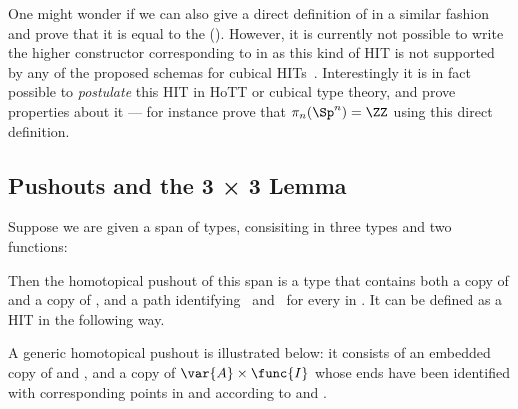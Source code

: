One might wonder if we can also give a direct definition of
 in a similar fashion and prove that it is equal to the
(). However, it is currently not possible to
write the higher constructor corresponding to  in \CubicalAgda 
as this kind of HIT is not supported by any of the proposed
schemas for cubical HITs~. Interestingly it
is in fact possible to \emph{postulate} this HIT in HoTT or cubical
type theory, and prove properties about it --- for instance
 prove that $\pi_n(\Sp^n) = \ZZ$ using this direct
definition.

\subsection{Pushouts and the 3 × 3 Lemma}
\label{sec:pushout}

Suppose we are given a span of types, consisiting in three types and two functions:

\begin{center}
\end{center}

Then the homotopical pushout of this span is a type that contains both
a copy of  and a copy of , and a path identifying
\, and \, for every  in .
It can be defined as a HIT in the following way.
% 
% 


A generic homotopical pushout is illustrated below: it consists of an
embedded copy of  and , and a copy of
\( \var{A} \times \func{I} \) whose ends have been identified with
corresponding points in  and  according to  and
.

